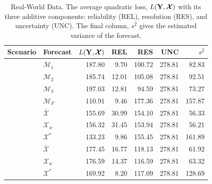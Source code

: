\documentclass[11pt]{article}
\theoremstyle{definition}
\theoremstyle{definition}
\def\Y{{\bf Y}}
\begin{document}
\begin{table}[h!]
\centering
\caption{Real-World Data. The average quadratic loss, $L(\Y,\boldsymbol{\mathcal{X}} )$ with its three additive components: reliability (REL), resolution (RES), and uncertainty (UNC). The final column, $s^2$ gives the estimated variance of the forecast. } 
\begin{tabular}{llrrrrr}
  \hline \hline
Scenario &  Forecast & $L(\Y,\boldsymbol{\mathcal{X}} )$ & REL & RES & UNC & $s^2$\\ 
  \hline
 &  $\mathcal{M}_1$ & 187.80 & 9.70 & 100.72 & 278.81 & 82.83 \\ 
& $\mathcal{M}_2$  & 185.74 & 12.01 & 105.08 & 278.81 & 92.51 \\ 
  & $\mathcal{M}_3$ & 197.03 & 12.81 & 94.59 & 278.81 & 73.27 \\ 
&$\mathcal{M}_F$  & 110.91 & 9.46 & 177.36 & 278.81 & 157.87 \\ \rule{0pt}{2.9ex} 
\multirow{3}{*}{No Overlap} &  $\bar{\mathcal{X}}$ & 155.69 & 30.99 & 154.10 & 278.81 & 56.33 \\ 
 & $\mathcal{X}_w$ & 156.32 & 31.45 & 153.94 & 278.81 & 56.21 \\ 
  &$\mathcal{X}^*$ & 133.23 & 9.86 & 155.45 & 278.81 & 161.89 \\ \rule{0pt}{2.9ex} 
 \multirow{3}{*}{High Overlap}  & $\bar{\mathcal{X}}$ & 177.45 & 16.77 & 118.13 & 278.81 & 61.92 \\ 
  & $\mathcal{X}_w$ & 176.59 & 14.37 & 116.59 & 278.81 & 63.32 \\ 
 & $\mathcal{X}^*$ & 169.92 & 8.20 & 117.09 & 278.81 & 128.69 \\ 
\hline
\end{tabular}
\label{NoTbl}
\end{table}
\end{document}
